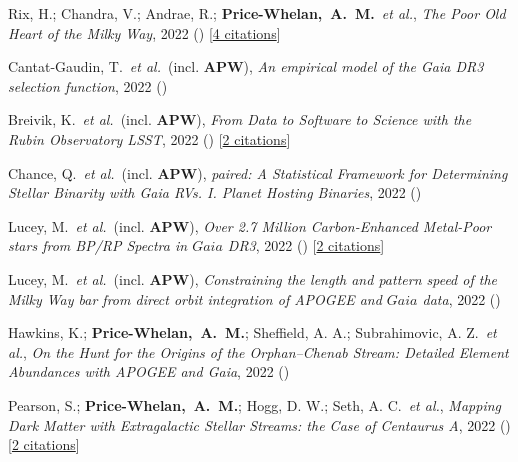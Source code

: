 \item[{\color{deemph}\scriptsize19}]Rix, H.; Chandra, V.; Andrae, R.; \textbf{Price-Whelan,~A.~M.}~\textit{et al.}, \textit{The Poor Old Heart of the Milky Way}, 2022 () [\href{http://adsabs.harvard.edu/abs/2022arXiv220902722R}{4 citations}]

\item[{\color{deemph}\scriptsize18}]Cantat-Gaudin, T.~\textit{et al.}~(incl. \textbf{APW}), \textit{An empirical model of the Gaia DR3 selection function}, 2022 ()

\item[{\color{deemph}\scriptsize17}]Breivik, K.~\textit{et al.}~(incl. \textbf{APW}), \textit{From Data to Software to Science with the Rubin Observatory LSST}, 2022 () [\href{http://adsabs.harvard.edu/abs/2022arXiv220802781B}{2 citations}]

\item[{\color{deemph}\scriptsize16}]Chance, Q.~\textit{et al.}~(incl. \textbf{APW}), \textit{paired: A Statistical Framework for Determining Stellar Binarity with Gaia RVs. I. Planet Hosting Binaries}, 2022 ()

\item[{\color{deemph}\scriptsize15}]Lucey, M.~\textit{et al.}~(incl. \textbf{APW}), \textit{Over 2.7 Million Carbon-Enhanced Metal-Poor stars from BP/RP Spectra in $Gaia$ DR3}, 2022 () [\href{http://adsabs.harvard.edu/abs/2022arXiv220608299L}{2 citations}]

\item[{\color{deemph}\scriptsize14}]Lucey, M.~\textit{et al.}~(incl. \textbf{APW}), \textit{Constraining the length and pattern speed of the Milky Way bar from direct orbit integration of APOGEE and $Gaia$ data}, 2022 ()

\item[{\color{deemph}\scriptsize13}]Hawkins, K.; \textbf{Price-Whelan,~A.~M.}; Sheffield, A. A.; Subrahimovic, A. Z.~\textit{et al.}, \textit{On the Hunt for the Origins of the Orphan--Chenab Stream: Detailed Element Abundances with APOGEE and Gaia}, 2022 ()

\item[{\color{deemph}\scriptsize12}]Pearson, S.; \textbf{Price-Whelan,~A.~M.}; Hogg, D. W.; Seth, A. C.~\textit{et al.}, \textit{Mapping Dark Matter with Extragalactic Stellar Streams: the Case of Centaurus A}, 2022 () [\href{http://adsabs.harvard.edu/abs/2022arXiv220512277P}{2 citations}]


